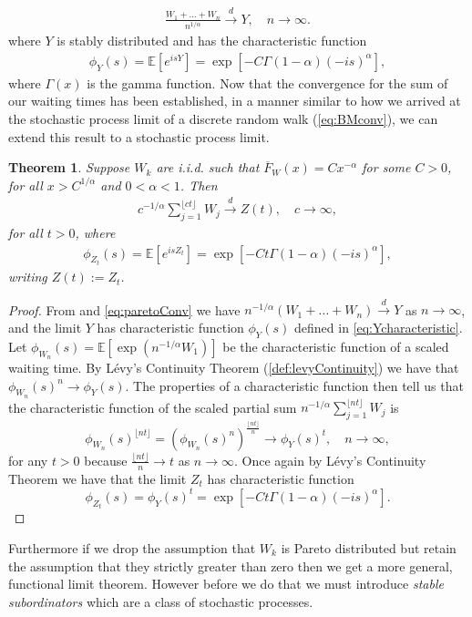 \documentclass[honours,12pt]{unswthesis}
\newcommand{\E}{\mathbb{E}}
\newcommand{\1}{\mathbf 1}
\newcommand{\Floor}[1]{{\lfloor {#1} \rfloor}}
\newcommand{\cd}{\overset{d}{\longrightarrow}}
\newtheorem{theorem}[equation]{Theorem}
\numberwithin{equation}{section}
\theoremstyle{definition}
\theoremstyle{remark}
\begin{document}
\begin{align}\label{eq:paretoConv}
	\frac{W_1 + \ldots + W_n}{n^{1/\alpha}} \overset{d}{\longrightarrow} Y, \quad n \to \infty.
\end{align}
\noindent where $Y$ is stably distributed and has the characteristic function
\begin{align}\label{eq:Ycharacteristic}
	\phi_Y(s)=\E[e^{isY}]=\exp[-C\Gamma(1-\alpha)(-is)^\alpha],
\end{align}
\noindent where $\Gamma(x)$ is the gamma function. Now that the convergence for the sum of our waiting times has been established, in a manner similar to how we arrived at the stochastic process limit of a discrete random walk (\ref{eq:BMconv}), we can extend this result to a stochastic process limit.
\begin{theorem}\cite[Th~3.41]{MeerschaertSikorskii2012}
Suppose $W_k$ are i.i.d. such that $\overline F_W(x)=Cx^{-\alpha}$ for some $C>0$, for all $x>C^{1/\alpha}$ and $0<\alpha<1$. Then
\begin{align}\label{eq:partialParetoSum}
	c^{-1/\alpha}\sum\limits^\Floor{ct}_{j=1} W_j \cd Z(t), \quad c \to \infty,
\end{align}
for all $t>0$, where
\begin{align}
	\phi_{Z_t}(s)=\E[e^{isZ_t}]=\exp[-Ct\Gamma(1-\alpha)(-is)^\alpha],
\end{align}
writing $Z(t):=Z_t$.
\end{theorem} 
\begin{proof}
From \cite[Th~3.39]{MeerschaertSikorskii2012} and \ref{eq:paretoConv} we have $n^{-1/\alpha}(W_1 + \ldots + W_n) \overset{d}{\longrightarrow} Y$ as $n \to \infty$, and the limit $Y$ has characteristic function $\phi_Y(s)$ defined in \ref{eq:Ycharacteristic}. Let $\phi_{W_n}(s)=\E[\exp(n^{-1/\alpha}W_1)]$ be the characteristic function of a scaled waiting time. By L\'{e}vy's Continuity Theorem (\ref{def:levyContinuity}) we have that $\phi_{W_n}(s)^n\to \phi_Y(s)$. The properties of a characteristic function then tell us that the characteristic function of the scaled partial sum $n^{-1/\alpha}\sum\limits^\Floor{nt}_{j=1} W_j$ is
\[
	\phi_{W_n}(s)^\Floor{nt}=\left(\phi_{W_n}(s)^n\right)^\frac{\Floor{nt}}{n}\to\phi_Y(s)^t,\quad n \to\infty,
\]
for any $t>0$ because $\frac{\Floor{nt}}{n}\to t$ as $n\to\infty$. Once again by L\'{e}vy's Continuity Theorem we have that the limit $Z_t$ has characteristic function
\[
	\phi_{Z_t}(s)=\phi_Y(s)^t=\exp[-Ct\Gamma(1-\alpha)(-is)^\alpha].
\]
\end{proof}
Furthermore if we drop the assumption that $W_k$ is Pareto distributed but retain the assumption that they strictly greater than zero then we get a more general, functional limit theorem. However before we do that we must introduce \emph{stable subordinators} which are a class of stochastic processes.
\end{document}
